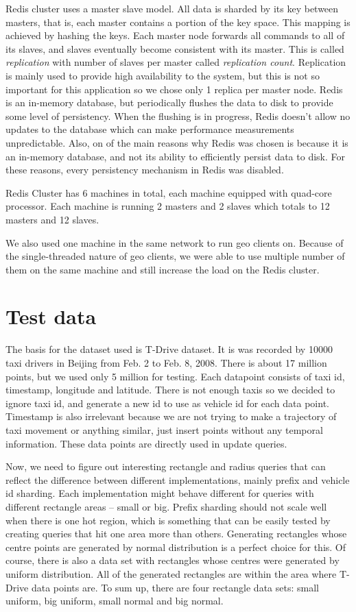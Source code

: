 \documentclass[times, utf8, diplomski]{fer}
\begin{document}
Redis cluster uses a master slave model. All data is sharded by its key between masters, that is, each master contains a portion of the key space. This mapping is achieved by hashing the keys. Each master node forwards all commands to all of its slaves, and slaves eventually become consistent with its master. This is called \emph{replication} with number of slaves per master called \emph{replication count}. Replication is mainly used to provide high availability to the system, but this is not so important for this application so we chose only 1 replica per master node.
Redis is an in-memory database, but periodically flushes the data to disk to provide some level of persistency. When the flushing is in progress, Redis doesn't allow no updates to the database which can make performance measurements unpredictable. Also, on of the main reasons why Redis was chosen is because it is an in-memory database, and not its ability to efficiently persist data to disk. For these reasons, every persistency mechanism in Redis was disabled.

Redis Cluster has 6 machines in total, each machine equipped with quad-core processor. Each machine is running 2 masters and 2 slaves which totals to 12 masters and 12 slaves. 

We also used one machine in the same network to run geo clients on. Because of the single-threaded nature of geo clients, we were able to use multiple number of them on the same machine and still increase the load on the Redis cluster.

\section {Test data} \label{test}
The basis for the dataset used is T-Drive \cite{tdrive1, tdrive2} dataset. It is was recorded by 10000 taxi drivers in Beijing from Feb. 2 to Feb. 8, 2008. There is about 17 million points, but we used only 5 million for testing. Each datapoint consists of taxi id, timestamp, longitude and latitude. There is not enough taxis so we decided to ignore taxi id, and generate a new id to use as vehicle id for each data point. Timestamp is also irrelevant because we are not trying to make a trajectory of taxi movement or anything similar, just insert points without any temporal information. These data points are directly used in update queries.

Now, we need to figure out interesting rectangle and radius queries that can reflect the difference between different implementations, mainly prefix and vehicle id sharding. Each implementation might behave different for queries with different rectangle areas -- small or big. Prefix sharding should not scale well when there is one hot region, which is something that can be easily tested by creating queries that hit one area more than others. Generating rectangles whose centre points are generated by normal distribution is a perfect choice for this. Of course, there is also a data set with rectangles whose centres were generated by uniform distribution. All of the generated rectangles are within the area where T-Drive data points are. To sum up, there are four rectangle data sets: small uniform, big uniform, small normal and big normal.
\end{document}
